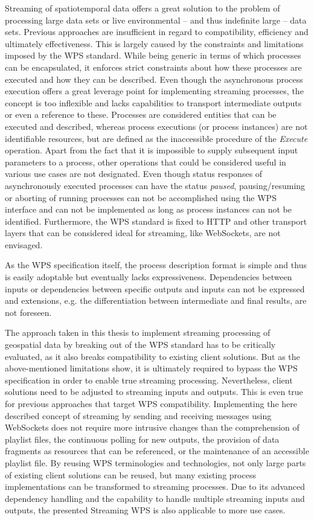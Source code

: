 Streaming of spatiotemporal data offers a great solution to the problem of processing large data sets or live environmental -- and thus indefinite large -- data sets. Previous approaches are insufficient in regard to compatibility, efficiency and ultimately effectiveness. This is largely caused by the constraints and limitations imposed by the WPS standard. While being generic in terms of which processes can be encapsulated, it enforces strict constraints about how these processes are executed and how they can be described. Even though the asynchronous process execution offers a great leverage point for implementing streaming processes, the concept is too inflexible and lacks capabilities to transport intermediate outputs or even a reference to these. Processes are considered entities that can be executed and described, whereas process executions (or process instances) are not identifiable resources, but are defined as the inaccessible procedure of the \emph{Execute} operation. Apart from the fact that it is impossible to supply subsequent input parameters to a process, other operations that could be considered useful in various use cases are not designated. Even though status responses of asynchronously executed processes can have the status \emph{paused}, pausing/resuming or aborting of running processes can not be accomplished using the WPS interface and can not be implemented as long as process instances can not be identified. Furthermore, the WPS standard is fixed to HTTP and other transport layers that can be considered ideal for streaming, like WebSockets, are not envisaged.

As the WPS specification itself, the process description format is simple and thus is easily adoptable but eventually lacks expressiveness. Dependencies between inputs or dependencies between specific outputs and inputs can not be expressed and extensions, e.g. the differentiation between intermediate and final results, are not foreseen.

The approach taken in this thesis to implement streaming processing of geospatial data by breaking out of the WPS standard has to be critically evaluated, as it also breaks compatibility to existing client solutions. But as the above-mentioned limitations show, it is ultimately required to bypass the WPS specification in order to enable true streaming processing. Nevertheless, client solutions need to be adjusted to streaming inputs and outputs. This is even true for previous approaches that target WPS compatibility. Implementing the here described concept of streaming by sending and receiving messages using WebSockets does not require more intrusive changes than the comprehension of playlist files, the continuous polling for new outputs, the provision of data fragments as resources that can be referenced, or the maintenance of an accessible playlist file. By reusing WPS terminologies and technologies, not only large parts of existing client solutions can be reused, but many existing process implementations can be transformed to streaming processes. Due to its advanced dependency handling and the capability to handle multiple streaming inputs and outputs, the presented Streaming WPS is also applicable to more use cases.

